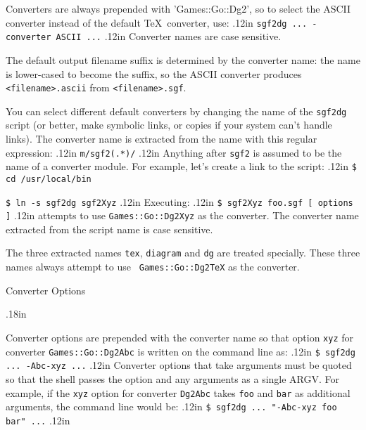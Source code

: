 Converters are always prepended with 'Games::Go::Dg2', so to select
the ASCII converter instead of the default \TeX\ converter, use:
\vglue.12in
    {\tt sgf2dg ... -converter ASCII ...}
\vglue.12in
Converter names are case sensitive.

The default output filename suffix is determined by the converter name: the
name is lower-cased to become the suffix, so the ASCII converter produces
{\tt <filename>.ascii} from {\tt <filename>.sgf}.

You can select different default converters by changing the name of
the {\tt sgf2dg} script (or better, make symbolic links, or copies if
your system can't handle links).  The converter name is extracted
from the name with this regular expression:
\vglue.12in
    {\tt m/sgf2(.*)/}
\vglue.12in
Anything after {\tt sgf2} is assumed to be the name of a converter
module.  For example, let's create a link to the script:
\vglue.12in
    {\tt \$ cd /usr/local/bin}

    {\tt \$ ln -s sgf2dg sgf2Xyz}
\vglue.12in
Executing:
\vglue.12in
    {\tt \$ sgf2Xyz foo.sgf [ options ]}
\vglue.12in
\noindent
attempts to use {\tt Games::Go::Dg2Xyz} as the converter.  The
converter name extracted from the script name is case sensitive.


The three extracted names {\tt tex}, {\tt diagram} and {\tt dg}
are treated specially. These three names always attempt to use {\tt
Games::Go::Dg2TeX} as the converter.

% 
% 

\vfil\eject
\centerline{\titlefont Converter Options}
\vglue.18in

Converter options are prepended with the converter name so that
option {\tt xyz} for converter {\tt Games::Go::Dg2Abc} is written on
the command line as:
\vglue.12in
    {\tt \$ sgf2dg ... -Abc-xyz ...}
\vglue.12in
Converter options that take arguments must be quoted so that the
shell passes the option and any arguments as a single ARGV.  For
example, if the {\tt xyz} option for converter {\tt Dg2Abc} takes {\tt foo} and
{\tt bar} as additional arguments, the command line would be:
\vglue.12in
    {\tt \$ sgf2dg ... "-Abc-xyz foo bar" ...}
\vglue.12in

